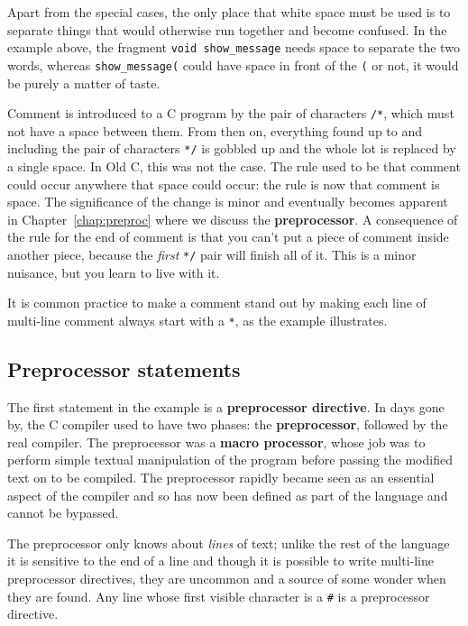    Apart from the special cases, the only place that white space must be
    used is to separate things that would otherwise run together and become
    confused. In the example above, the fragment \texttt{void show\_message}
    needs space to separate the two words, whereas \texttt{show\_message(}
    could have space in front of the \texttt{(} or not, it would be purely
    a matter of taste.


   Comment is introduced to a C program by the pair of characters
    \texttt{/*}, which must not have a space between them. From then on,
    everything found up to and including the pair of characters \texttt{*/}
    is gobbled up and the whole lot is replaced by a single space. In Old C,
    this was not the case. The rule used to be that comment could occur
    anywhere that space could occur: the rule is now that comment is space. The
    significance of the change is minor and eventually becomes apparent in
    Chapter~\ref{chap:preproc} where we discuss the \textbf{preprocessor}. A
    consequence of the rule for the end of comment is that you can't put a
    piece of comment inside another piece, because the \textit{first}
    \texttt{*/} pair will finish all of it. This is a minor nuisance, but
    you learn to live with it.


   It is common practice to make a comment stand out by making each line of
    multi-line comment always start with a \texttt{*}, as the example
    illustrates.


  

  \subsection{Preprocessor statements}
   

   The first statement in the example is a \textbf{preprocessor
    directive}. In days gone by, the C compiler used to have two phases:
    the \textbf{preprocessor}, followed by the real compiler. The
    preprocessor was a \textbf{macro processor}, whose job was to perform
    simple textual manipulation of the program before passing the modified text
    on to be compiled.  The preprocessor rapidly became seen as an essential
    aspect of the compiler and so has now been defined as part of the language
    and cannot be bypassed.


   The preprocessor only knows about \textit{lines} of text; unlike the rest
    of the language it is sensitive to the end of a line and though it is
    possible to write multi-line preprocessor directives, they are uncommon and
    a source of some wonder when they are found. Any line whose first visible
    character is a \texttt{\#} is a preprocessor directive.


